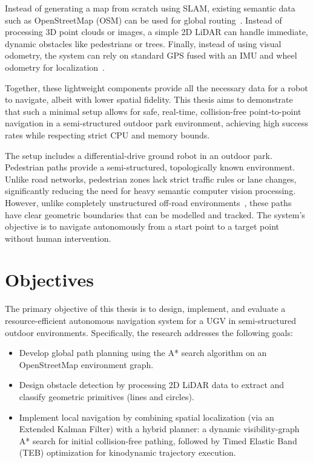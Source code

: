 Instead of generating a map from scratch using SLAM, existing semantic data such as OpenStreetMap (OSM) can be used for global routing~\cite{hentschel2010osm}. Instead of processing 3D point clouds or images, a simple 2D LiDAR can handle immediate, dynamic obstacles like pedestrians or trees. Finally, instead of using visual odometry, the system can rely on standard GPS fused with an IMU and wheel odometry for localization~\cite{moore2015ekf}.

Together, these lightweight components provide all the necessary data for a robot to navigate, albeit with lower spatial fidelity. This thesis aims to demonstrate that such a minimal setup allows for safe, real-time, collision-free point-to-point navigation in a semi-structured outdoor park environment, achieving high success rates while respecting strict CPU and memory bounds.

The setup includes a differential-drive ground robot in an outdoor park. Pedestrian paths provide a semi-structured, topologically known environment. Unlike road networks, pedestrian zones lack strict traffic rules or lane changes, significantly reducing the need for heavy semantic computer vision processing.
However, unlike completely unstructured off-road environments~\cite{min2026offroad}, these paths have clear geometric boundaries that can be modelled and tracked. The system's objective is to navigate autonomously from a start point to a target point without human intervention.

\section{Objectives}
\label{sec:objectives}


The primary objective of this thesis is to design, implement, and evaluate a resource-efficient autonomous navigation system for a UGV in semi-structured outdoor environments. Specifically, the research addresses the following goals:

\begin{itemize}
\item Develop global path planning using the A* search algorithm on an OpenStreetMap environment graph.
\item Design obstacle detection by processing 2D LiDAR data to extract and classify geometric primitives (lines and circles).
\item Implement local navigation by combining spatial localization (via an Extended Kalman Filter) with a hybrid planner: a dynamic visibility-graph A* search for initial collision-free pathing, followed by Timed Elastic Band (TEB) optimization for kinodynamic trajectory execution.
\end{itemize}

